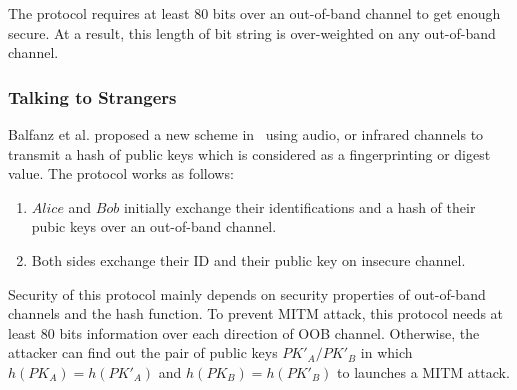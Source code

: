 The protocol requires at least 80 bits over an out-of-band channel to get enough secure. At a result, this length of bit string is over-weighted on any out-of-band channel. 
 
\subsubsection{Talking to Strangers}

Balfanz et al. proposed a new scheme in~\cite{Smetters02talkingto} using audio, or infrared channels to transmit a hash of public keys which is considered as a fingerprinting or digest value. The protocol works as follows:
\begin{enumerate}
\item $Alice$ and $Bob$ initially exchange their identifications and a hash of their pubic keys over an out-of-band channel.
\item Both sides exchange their ID and their public key on insecure channel. 
\end{enumerate}

\begin{center}
\end{center}

Security of this protocol mainly depends on security properties of out-of-band channels and the hash function. To prevent MITM attack, this protocol needs at least 80 bits information over each direction of OOB channel. Otherwise, the attacker can find out the pair of public keys $PK'_A/PK'_B$ in which $h(PK_A) = h(PK'_A)$ and $h(PK_B) = h(PK'_B)$ to launches a MITM attack.

